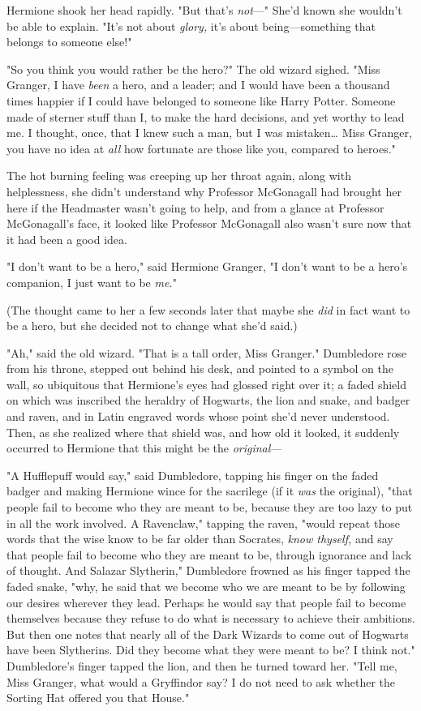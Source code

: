 Hermione shook her head rapidly. "But that's \emph{not}---" She'd known she
wouldn't be able to explain. "It's not about \emph{glory,} it's about
being---something that belongs to someone else!"

"So you think you would rather be the hero?" The old wizard sighed. "Miss
Granger, I have \emph{been} a hero, and a leader; and I would have been a
thousand times happier if I could have belonged to someone like Harry Potter.
Someone made of sterner stuff than I, to make the hard decisions, and yet
worthy to lead me. I thought, once, that I knew such a man, but I was
mistaken{\ldots} Miss Granger, you have no idea at \emph{all} how fortunate are
those like you, compared to heroes."

The hot burning feeling was creeping up her throat again, along with
helplessness, she didn't understand why Professor McGonagall had brought her
here if the Headmaster wasn't going to help, and from a glance at Professor
McGonagall's face, it looked like Professor McGonagall also wasn't sure now
that it had been a good idea.

"I don't want to be a hero," said Hermione Granger, "I don't want to be a
hero's companion, I just want to be \emph{me.}"

(The thought came to her a few seconds later that maybe she \emph{did} in fact
want to be a hero, but she decided not to change what she'd said.)

"Ah," said the old wizard. "That is a tall order, Miss Granger." Dumbledore
rose from his throne, stepped out behind his desk, and pointed to a symbol on
the wall, so ubiquitous that Hermione's eyes had glossed right over it; a faded
shield on which was inscribed the heraldry of Hogwarts, the lion and snake, and
badger and raven, and in Latin engraved words whose point she'd never
understood. Then, as she realized where that shield was, and how old it looked,
it suddenly occurred to Hermione that this might be the \emph{original}---

"A Hufflepuff would say," said Dumbledore, tapping his finger on the faded
badger and making Hermione wince for the sacrilege (if it \emph{was} the
original), "that people fail to become who they are meant to be, because they
are too lazy to put in all the work involved. A Ravenclaw," tapping the raven,
"would repeat those words that the wise know to be far older than Socrates,
\emph{know thyself,} and say that people fail to become who they are meant to
be, through ignorance and lack of thought. And Salazar Slytherin," Dumbledore
frowned as his finger tapped the faded snake, "why, he said that we become who
we are meant to be by following our desires wherever they lead. Perhaps he
would say that people fail to become themselves because they refuse to do what
is necessary to achieve their ambitions. But then one notes that nearly all of
the Dark Wizards to come out of Hogwarts have been Slytherins. Did they become
what they were meant to be? I think not." Dumbledore's finger tapped the lion,
and then he turned toward her. "Tell me, Miss Granger, what would a Gryffindor
say? I do not need to ask whether the Sorting Hat offered you that House."

